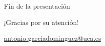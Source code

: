\documentclass[xcolor=svgnames]{beamer}
\begin{document}
\appendix

\begin{frame}{Fin de la presentación}
  \begin{center}
    {\Huge ¡Gracias por su atención!}

    \vspace{3em}

    {\Large
      \href{mailto:antonio.garciadominguez@uca.es}{antonio.garciadominguez@uca.es}}
  \end{center}
\end{frame}
\end{document}
